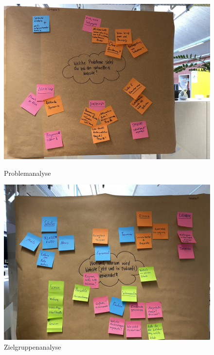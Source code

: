 \begin{figure}
    \begin{minipage}[b]{.4\linewidth} 
       \includegraphics[width=\linewidth]{pics/problemanalyse.jpg}
       \caption{Problemanalyse}
    \end{minipage}
    \hspace{.05\linewidth}
    \begin{minipage}[b]{.4\linewidth}
       \includegraphics[width=\linewidth]{pics/zielgruppenanalyse.jpg}
       \caption{Zielgruppenanalyse}
    \end{minipage}
 \end{figure}

